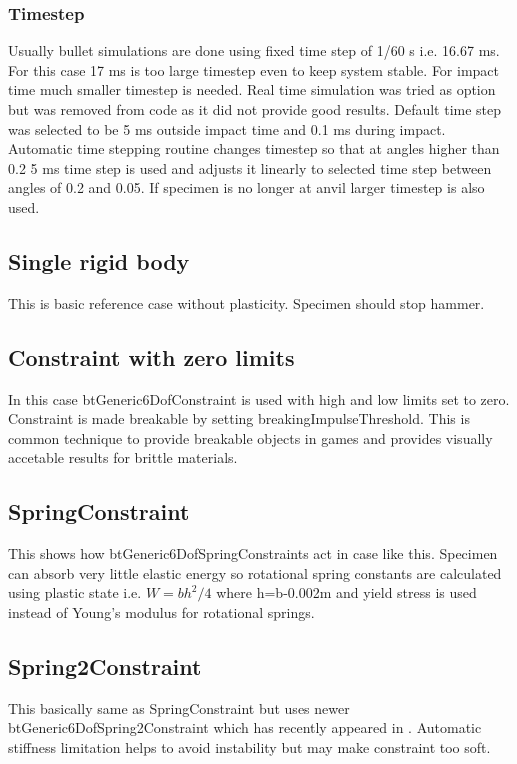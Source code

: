 \subsubsection{Timestep}

Usually bullet simulations are done using fixed time step of 1/60 s i.e. 16.67 ms. 
For this case 17 ms is too large timestep even to keep system stable. For impact time much smaller timestep is needed. 
Real time simulation was tried as option but was removed from code as it did not provide good results.  
Default time step was selected to be 5 ms outside impact time and 0.1 ms during impact. 
Automatic time stepping routine changes timestep so that at angles higher than 0.2 5 ms time step is
used and adjusts it linearly to selected time step between angles of 0.2 and 0.05. If specimen is no
longer at anvil larger timestep is also used.

\subsection{Single rigid body}
This is basic reference case without plasticity. Specimen should stop hammer.

\subsection{Constraint with zero limits}
In this case btGeneric6DofConstraint is used with high and low limits set to zero. 
Constraint is made breakable by setting breakingImpulseThreshold.
This is common technique to provide breakable objects in games and provides visually accetable results for brittle materials.

\subsection{SpringConstraint}
This shows how btGeneric6DofSpringConstraints act in case like this. 
Specimen can absorb very little elastic energy so rotational spring constants are calculated using plastic state i.e.
$W=bh^2/4$ where h=b-0.002m and yield stress is used instead of Young’s modulus for rotational springs.

\subsection{Spring2Constraint}
This basically same as SpringConstraint but uses newer btGeneric6DofSpring2Constraint which has recently appeared in
\bullet. 
Automatic stiffness limitation helps to avoid instability but may make constraint too soft.

